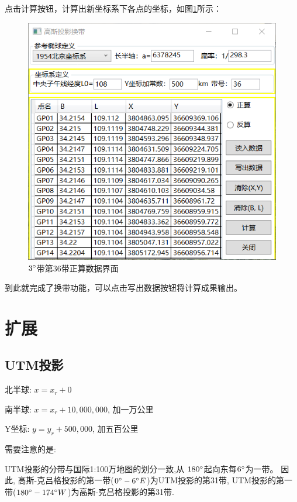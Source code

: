 点击计算按钮，计算出新坐标系下各点的坐标，如图\ref{fig:GaussProjUI06}所示：
\begin{figure}[htbp]
    \centering
    \includegraphics[scale=0.8]{chapter/gaussProj/UI06.png}
    \caption{$3^\circ$带第36带正算数据界面}
    \label{fig:GaussProjUI06}
\end{figure}

到此就完成了换带功能，可以点击写出数据按钮将计算成果输出。

\section{扩展}

\subsection{UTM投影}

北半球: $x = x_r + 0$

南半球: $x = x_r + 10,000,000$, 加一万公里

Y坐标: $y = y_r + 500,000$, 加五百公里

需要注意的是:

UTM投影的分带与国际1:100万地图的划分一致,从 $180^\circ$起向东每$6^\circ$为一带。
因此, 高斯-克吕格投影的第一带($0^\circ - 6^\circ E$)为UTM投影的第31带,
UTM投影的第一带($180^\circ - 174^\circ W$)为高斯-克吕格投影的第31带.

